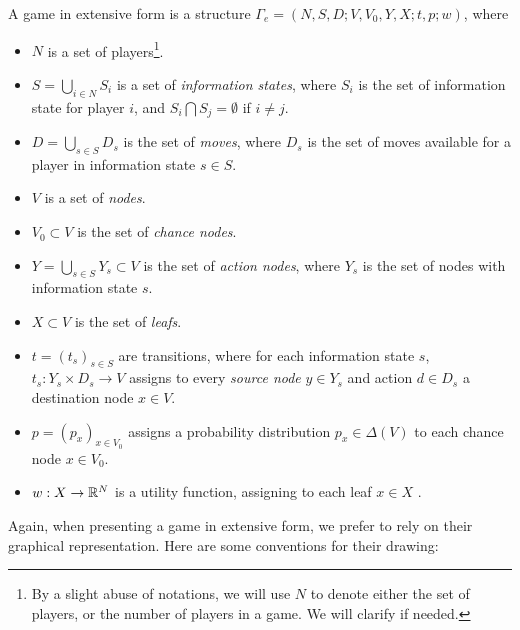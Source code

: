 \begin{definition}
\label{def:extform}
A game in extensive form is a structure $\Gamma_e = (N, S, D; V, V_0, Y, X; t, p; w)$,
where
\begin{itemize}
\item $N$ is a set of players\footnote{By a slight abuse of notations, we will use $N$ to denote either the set of players, or the number of players in a game. We will clarify if needed.}.
\item $S = \bigcup_{i \in N} S_i$ is a set of \emph{information states}, where $S_i$ is the set of information state for player $i$, and $S_i \bigcap S_j = \emptyset$ if $i  \neq j$.
\item $D = \bigcup_{s \in S} D_s$ is the set of \emph{moves}, where $D_s$ is the set of moves available for a  player in information state $s \in S$.
\item $V$ is a set of \emph{nodes}.
\item $V_0 \subset V$ is the set of \emph{chance nodes}.
\item $Y = \bigcup_{s \in S} Y_s \subset V$ is the set of \emph{action nodes}, where $Y_s$ is the set of nodes with information state $s$.
\item $X \subset V$ is the set of \emph{leafs}.
\item $t = (t_s)_{s \in S}$ are transitions, where for each information state $s$,  $t_s : Y_s \times D_s \rightarrow V$ assigns to every \emph{source node} $y \in Y_s$ and action $d \in D_s$ a destination node $x \in V$.
\item $p = (p_{x})_{x \in V_0}$ assigns a probability distribution $p_x \in \Delta(V)$ to each chance node $x \in V_0$.
\item $w : X \rightarrow \mathbb{R}^N$ is a utility function, assigning to each leaf $x \in X$ .
\end{itemize}
\end{definition}

Again, when presenting a game in extensive form, we prefer to rely on their graphical representation. Here are some conventions for their drawing:


